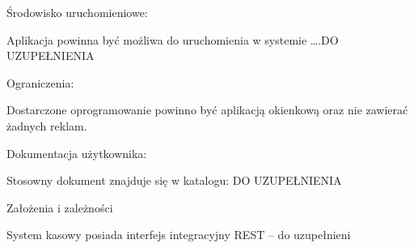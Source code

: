 \documentclass[a4paper,12pt]{article}
\begin{document}
Środowisko uruchomieniowe:

Aplikacja powinna być możliwa do uruchomienia w systemie ….DO UZUPEŁNIENIA

Ograniczenia:

Dostarczone oprogramowanie powinno być aplikacją okienkową oraz nie zawierać żadnych reklam.

Dokumentacja użytkownika:

Stosowny dokument znajduje się w katalogu: DO UZUPEŁNIENIA

Założenia i zależności

System kasowy posiada interfejs integracyjny REST – do uzupełnieni
\end{document}
